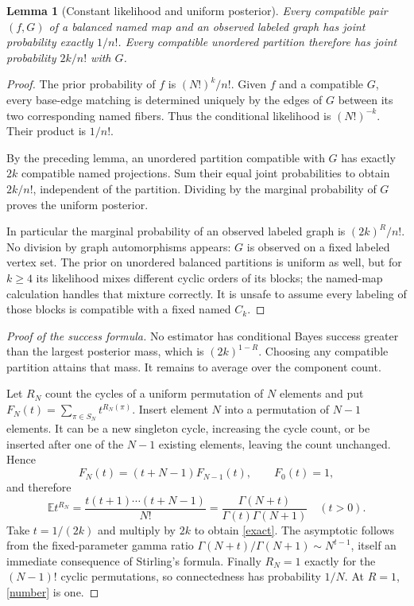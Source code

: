 \documentclass[11pt]{article}
\newtheorem{lemma}{Lemma}
\newcommand{\E}{\mathbb E}
\begin{document}
\begin{lemma}[Constant likelihood and uniform posterior]
Every compatible pair $(f,G)$ of a balanced named map and an observed
labeled graph has joint probability exactly $1/n!$. Every compatible
unordered partition therefore has joint probability $2k/n!$ with $G$.
\end{lemma}
\begin{proof}
The prior probability of $f$ is $(N!)^k/n!$. Given $f$ and a compatible
$G$, every base-edge matching is determined uniquely by the edges of
$G$ between its two corresponding named fibers. Thus the conditional
likelihood is $(N!)^{-k}$. Their product is $1/n!$.

By the preceding lemma, an unordered partition compatible with $G$ has
exactly $2k$ compatible named projections. Sum their equal joint
probabilities to obtain $2k/n!$, independent of the partition. Dividing
by the marginal probability of $G$ proves the uniform posterior.

In particular the marginal probability of an observed labeled graph is
$(2k)^R/n!$. No division by graph automorphisms appears: $G$ is observed
on a fixed labeled vertex set. The prior on unordered balanced partitions
is uniform as well, but for $k\geq4$ its likelihood mixes different
cyclic orders of its blocks; the named-map calculation handles that
mixture correctly. It is unsafe to assume every labeling of those blocks
is compatible with a fixed named $C_k$.
\end{proof}

\begin{proof}[Proof of the success formula]
No estimator has conditional Bayes success greater than the largest
posterior mass, which is $(2k)^{1-R}$. Choosing any compatible partition
attains that mass. It remains to average over the component count.

Let $R_N$ count the cycles of a uniform permutation of $N$ elements and
put $F_N(t)=\sum_{\pi\in S_N}t^{R_N(\pi)}$. Insert element $N$ into a
permutation of $N-1$ elements. It can be a new singleton cycle, increasing
the cycle count, or be inserted after one of the $N-1$ existing elements,
leaving the count unchanged. Hence
\[
 F_N(t)=(t+N-1)F_{N-1}(t),\qquad F_0(t)=1,
\]
and therefore
\[
 \E t^{R_N}=\frac{t(t+1)\cdots(t+N-1)}{N!}
 =\frac{\Gamma(N+t)}{\Gamma(t)\Gamma(N+1)}\quad(t>0).
\]
Take $t=1/(2k)$ and multiply by $2k$ to obtain \eqref{exact}.
The asymptotic follows from the fixed-parameter gamma ratio
$\Gamma(N+t)/\Gamma(N+1)\sim N^{t-1}$, itself an immediate consequence
of Stirling's formula. Finally $R_N=1$ exactly for the $(N-1)!$ cyclic
permutations, so connectedness has probability $1/N$. At $R=1$,
\eqref{number} is one.
\end{proof}
\end{document}
